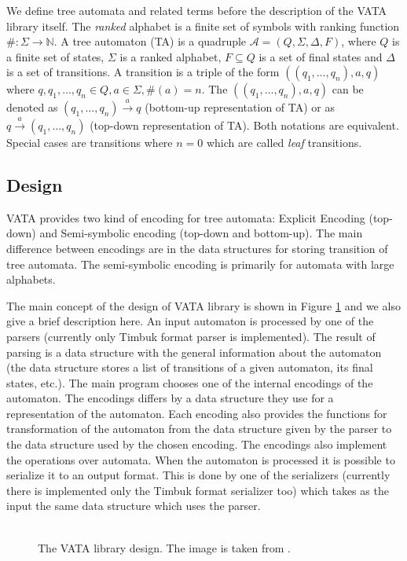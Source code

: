 We define tree automata and related terms before the description of the VATA library itself. The \emph{ranked} alphabet is a finite set of symbols
with ranking function 
$\#:\Sigma\rightarrow \mathbb{N}$. A tree automaton (TA) is a quadruple $\mathcal{A}=(Q,\Sigma,\Delta,F)$, where $Q$ is a finite set of states, $\Sigma$
is a ranked alphabet, $F\subseteq Q$ is a set of final states and $\Delta$ is a set of transitions. A transition is a triple of the form
$((q_1,\ldots,q_n),a,q)$ where $q,q_1,\ldots,q_n \in Q, a\in \Sigma, \#(a)=n$. The $((q_1,\ldots,q_n),a,q)$ can be denoted as $(q_1,\ldots,q_n)\xrightarrow{a}q$
(bottom-up representation of TA) or as $q\xrightarrow{a}(q_1,\ldots,q_n)$ (top-down representation of TA). Both notations are equivalent. Special cases
are transitions where $n=0$ which are called \emph{leaf} transitions.

\subsection{Design}
\label{sectionDesignVata}
VATA provides two kind of encoding for tree automata: Explicit Encoding (top-down) and Semi-symbolic encoding (top-down and bottom-up). The main difference
between encodings are
in the data structures for storing transition of tree automata. The semi-symbolic encoding is primarily for automata with large alphabets. 

The main concept of the design of VATA library is shown in Figure \ref{picVataDesign} and we also give a brief description here. 
An input automaton is processed by one of the parsers (currently
only Timbuk format parser is implemented). The result of parsing is a data structure with the general information about the automaton 
(the data structure stores a list
of transitions of a given automaton, its final states, etc.). The main program chooses one of the internal encodings of the automaton. The encodings
differs by a data structure they use for a representation of the automaton. Each encoding also provides the functions for transformation of the automaton 
from the data structure given by the parser to the data structure used by the chosen encoding. The encodings also implement
the operations over automata. When the automaton is processed it is possible to serialize it to an output format. 
This is done by one of the serializers (currently there is implemented only the Timbuk format serializer too) 
which takes as the input the same data structure which uses the parser.
\\
\\
\begin{figure}[h]
\begin{center}

		\caption{The VATA library design. The image is taken from \cite{libvata}.}
		\label{picVataDesign}
\end{center}
\end{figure}

